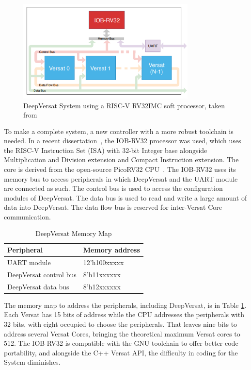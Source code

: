 \begin{figure}[!htbp]
    \centering
    \includegraphics[width=0.8\textwidth]{Figures/deep-Versat-top.png}
    \caption{DeepVersat System using a RISC-V RV32IMC soft processor, taken from~\cite{valter:deepversat}}
    \label{figure:deepversattop}
\end{figure} 

\quad To make a complete system, a new controller with a more robust toolchain is needed.
In a recent dissertation~\cite{valter:deepversat}, the IOB-RV32 processor was used, which uses the RISC-V Instruction Set (ISA) with 32-bit Integer base alongside Multiplication and Division extension and Compact Instruction extension.
 The core is derived from
the open-source PicoRV32 CPU~\cite{picorv}.
The IOB-RV32 uses its memory bus to access peripherals in which DeepVersat and the UART module are connected as such.
The control bus is used to access the configuration modules of DeepVersat. The data bus is used to read and write
a large amount of data into DeepVersat. The data flow bus is reserved for inter-Versat Core communication.

\begin{table}[!htbp]
    \centering
    \begin{tabular}{|ll|}
        \hline
        \textbf{Peripheral}     & \textbf{Memory address} \\ \hline
        UART module             & 12’h100xxxxx            \\ \hline
        DeepVersat control bus & 8’h11xxxxxx             \\ \hline
        DeepVersat data bus    & 8’h12xxxxxx             \\ \hline
        \end{tabular}
    \caption{DeepVersat Memory Map}
    \label{table:deepversat}
    \end{table}


The memory map to address the peripherals,
 including DeepVersat, is in Table \ref{table:deepversat}.
 Each Versat has 15 bits of address while the CPU addresses
 the peripherals with 32 bits, with eight occupied to choose
 the peripherals. That leaves nine bits to address several Versat Cores, bringing the theoretical maximum Versat cores to 512. The IOB-RV32 is compatible with the
 GNU toolchain to offer better code portability, and alongside the C++ Versat API, the difficulty
 in coding for the System diminishes.